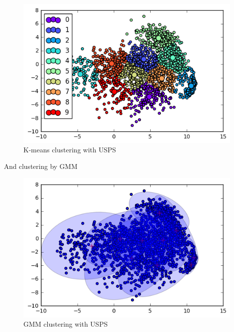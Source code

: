 \documentclass[a4paper,11pt]{article}
\begin{document}
\begin{figure}[htbp]
  \includegraphics[scale=0.6]{uspskm.png}
  \caption{K-means clustering with USPS}
\end{figure}

And clustering by GMM

\begin{figure}[htbp]
  \includegraphics[scale=0.6]{uspsgmm.png}
  \caption{GMM clustering with USPS}
\end{figure}
\end{document}
